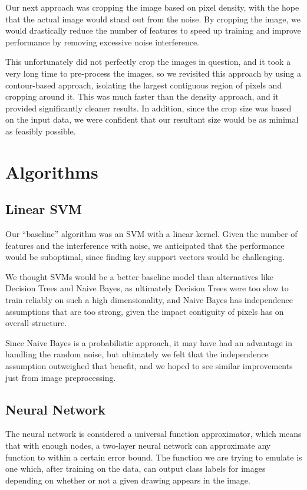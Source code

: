 \documentclass[conference]{IEEEtran}
\begin{document}
Our next approach was cropping the image based on pixel density, with the hope that the actual image would stand out from the noise. By cropping the image, we would drastically reduce the number of features to speed up training and improve performance by removing excessive noise interference.

This unfortunately did not perfectly crop the images in question, and it took a very long time to pre-process the images, so we revisited this approach by using a contour-based approach, isolating the largest contiguous region of pixels and cropping around it. This was much faster than the density approach, and it provided significantly cleaner results. In addition, since the crop size was based on the input data, we were confident that our resultant size would be as minimal as feasibly possible.

\section{Algorithms}

\subsection{Linear SVM}

Our ``baseline'' algorithm was an SVM with a linear kernel. Given the number of features and the interference with noise, we anticipated that the performance would be suboptimal, since finding key support vectors would be challenging.

We thought SVMs would be a better baseline model than alternatives like Decision Trees and Naive Bayes, as ultimately Decision Trees were too slow to train reliably on such a high dimensionality, and Naive Bayes has independence assumptions that are too strong, given the impact contiguity of pixels has on overall structure. 

Since Naive Bayes is a probabilistic approach, it may have had an advantage in handling the random noise, but ultimately we felt that the independence assumption outweighed that benefit, and we hoped to see similar improvements just from image preprocessing.

\subsection{Neural Network}

The neural network is considered a universal function approximator, which means that with enough nodes, a two-layer neural network can approximate any function to within a certain error bound. The function we are trying to emulate is one which, after training on the data, can output class labels for images depending on whether or not a given drawing appears in the image.
\end{document}
